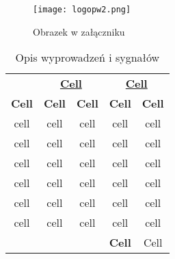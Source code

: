 
\clearpage
{}
\noindent\lipsum[1-3]
\begin{figure}[!h]
	\centering \texttt{[image: logopw2.png]}
	\caption{Obrazek w załączniku}
\end{figure}
\lipsum[4-7]

\clearpage
{}
\lipsum[1-2]
\begin{table}[H] \centering
    \caption{Opis wyprowadzeń i sygnałów}
    \label{tab:base_pins}
    \begin{tabular}{c c c c c}
        \toprule[2pt]
         & \multicolumn{2}{c}{\textbf{\uline{Cell}}}& \multicolumn{2}{c}{\textbf{\uline{Cell}}}   \\
        \textbf{{Cell}}  &\textbf{{Cell}}     &  \textbf{Cell}&   \textbf{Cell} &  \textbf{Cell} \\  \midrule
        cell  & cell & cell & cell & cell   \\
        cell  & cell & cell & cell & cell   \\
        cell  & cell & cell & cell & cell   \\
        cell  & cell & cell & cell & cell   \\
        cell  & cell & cell & cell & cell   \\ 
        cell  & cell & cell & cell & cell   \\ \midrule
        \multicolumn{4}{r}{\textbf{Cell}} & Cell \\
        \bottomrule[2pt]
    \end{tabular}
\end{table}
\lipsum[3-4]

